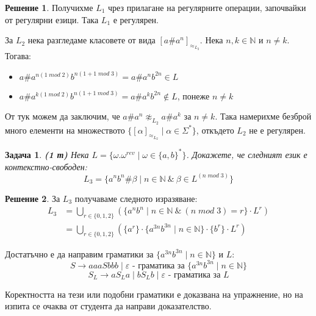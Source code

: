 \documentclass{article}
\newtheorem{problem}{Задача}
\theoremstyle{definition}
\newtheorem*{solution}{Решение}
\begin{document}
\begin{solution}
    Получихме $L_1$ чрез прилагане на регулярните операции, започвайки от регулярни езици.
    Така $L_1$ е регулярен.

    \pagebreak

    За $L_2$ нека разгледаме класовете от вида $[a \# a^n]_{\approx_{L_2}}$.
    Нека $n, k \in \mathbb{N}$ и $n \neq k$.
    Тогава:
    \begin{itemize}
        \item $a \# a^{n (1 \; mod \; 2)} b^{n (1 + 1 \; mod \; 3)} = a \# a^n b^{2n} \in L$
        \item $a \# a^{k (1 \; mod \; 2)} b^{n (1 + 1 \; mod \; 3)} = a \# a^k b^{2n} \notin L$, понеже $n \neq k$
    \end{itemize}
    От тук можем да заключим, че $a \# a^n \not\approx_{L_2} a \# a^k$ за $n \neq k$.
    Така намерихме безброй много елементи на множеството $\{ [\alpha]_{\approx_{L_2}} \mid \alpha \in \Sigma^* \}$, откъдето $L_2$ не е регулярен.
\end{solution}

\begin{problem} {\bf (1 т)}
Нека $L = \{\omega.\omega^{rev} \mid \omega \in \{a,b\}^{\ast}\}$. Докажете, че следният език е контекстно-свободен:
$$L_3 = \{ a^n b^n \# \beta \mid n \in \mathbb{N} \: \& \: \beta \in L^{(n \; mod \; 3)} \}$$
\end{problem}

\begin{solution}
    За $L_3$ получаваме следното изразяване:
    \begin{align*}
        L_3 & = \bigcup\limits_{r \in \{0, 1, 2\}} (\{ a^n b^n \mid n \in \mathbb{N} \: \& \: (n \; mod \; 3) = r \} \cdot L^r)          \\
            & = \bigcup\limits_{r \in \{0, 1, 2\}} (\{ a^r \} \cdot \{ a^{3n} b^{3n} \mid n \in \mathbb{N} \} \cdot \{ b^r \} \cdot L^r)
    \end{align*}

    Достатъчно е да направим граматики за $\{ a^{3n} b^{3n} \mid n \in \mathbb{N} \}$ и $L$:
    $$S \rightarrow aaa S bbb \mid \varepsilon \text{ - граматика за } \{ a^{3n} b^{3n} \mid n \in \mathbb{N} \}$$
    $$S_L \rightarrow a S_L a \mid b S_L b \mid \varepsilon \text{ - граматика за } L$$

    Коректността на тези или подобни граматики е доказвана на упражнение, но на изпита се очаква от студента да направи доказателство.
\end{solution}
\end{document}

